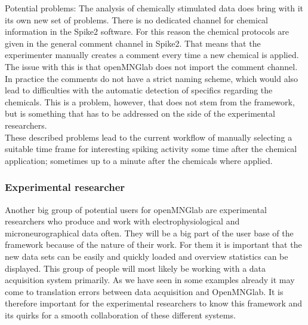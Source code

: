 Potential problems: The analysis of chemically stimulated data does bring with it its own new set of problems. There is no dedicated channel for chemical information in the Spike2 software. For this reason the chemical protocols are given in the general comment channel in Spike2. That means that the experimenter manually creates a comment every time a new chemical is applied. The issue with this is that openMNGlab does not import the comment channel. In practice the comments do not have a strict naming scheme, which would also lead to difficulties with the automatic detection of specifics regarding the chemicals. This is a problem, however, that does not stem from the framework, but is something that has to be addressed on the side of the experimental researchers.\\
These described problems lead to the current workflow of manually selecting a suitable time frame for interesting spiking activity some time after the chemical application; sometimes up to a minute after the chemicals where applied.

\subsubsection{Experimental researcher}
Another big group of potential users for openMNGlab are experimental researchers who produce and work with electrophysiological and microneurographical data often. They will be a big part of the user base of the framework because of the nature of their work. For them it is important that the new data sets can be easily and quickly loaded and overview statistics can be displayed. This group of people will most likely be working with a data acquisition system primarily. As we have seen in some examples already it may come to translation errors between data acquisition and OpenMNGlab. It is therefore important for the experimental researchers to know this framework and its quirks for a smooth collaboration of these different systems.


